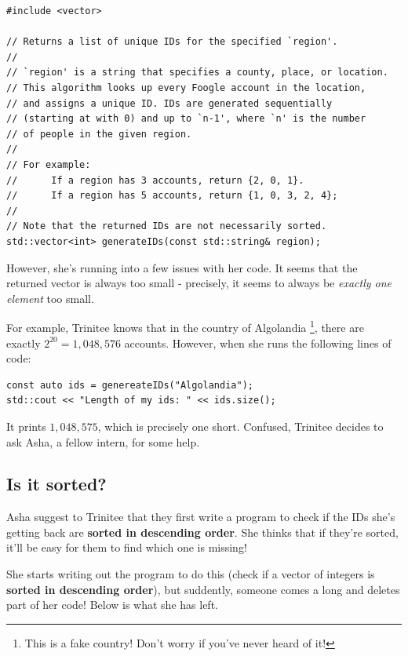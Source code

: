\documentclass [12pt]{article}
\begin{document}
\begin{verbatim}
#include <vector>

// Returns a list of unique IDs for the specified `region'.
//
// `region' is a string that specifies a county, place, or location.
// This algorithm looks up every Foogle account in the location,
// and assigns a unique ID. IDs are generated sequentially
// (starting at with 0) and up to `n-1', where `n' is the number
// of people in the given region.
//
// For example:
//      If a region has 3 accounts, return {2, 0, 1}.
//      If a region has 5 accounts, return {1, 0, 3, 2, 4};
//
// Note that the returned IDs are not necessarily sorted.
std::vector<int> generateIDs(const std::string& region);
\end{verbatim}

However, she's running into a few issues with her code. It seems that the returned vector is always too small - precisely, it seems to always be \textit{exactly one element} too small. 


For example, Trinitee knows that in the country of Algolandia \footnote{This is a fake country! Don't worry if you've never heard of it!}, there are exactly $2^{20} = 1,048,576$ accounts. However, when she runs the following lines of code:

\vspace{2em}
\begin{verbatim}
const auto ids = genereateIDs("Algolandia");
std::cout << "Length of my ids: " << ids.size();
\end{verbatim}

It prints $1,048,575$, which is precisely one short. Confused, Trinitee decides to ask Asha, a fellow intern, for some help.

\subsection{Is it sorted?}
 Asha suggest to Trinitee that they first write a program to check if the IDs she's getting back are \textbf{sorted in descending order}. She thinks that if they're sorted, it'll be easy for them to find which one is missing!

She starts writing out the program to do this (check if a vector of integers is \textbf{sorted in descending order}), but suddently, someone comes a long and deletes part of her code! Below is what she has left.

\vspace{2em} 
\end{document}

